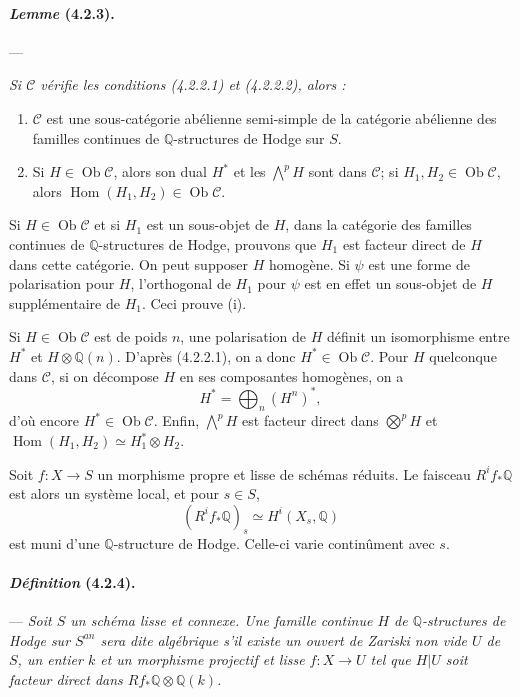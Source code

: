 \documentclass[10pt]{article}
\newcommand{\Q}{\mathbb Q}
\newcommand{\Hom}{\operatorname{Hom}}
\newcommand{\Ob}{\operatorname{Ob}}
\begin{document}
\paragraph{\emph{Lemme} (4.2.3).} --- {\itshape Si $\mathcal C$ vérifie les conditions (4.2.2.1) et (4.2.2.2), alors :
\begin{enumerate}[label=(\roman*)]
\item $\mathcal C$ est une sous-catégorie abélienne semi-simple de la catégorie abélienne des familles continues de $\Q$-structures de Hodge sur $S$.
\item Si $H\in\Ob\mathcal C$, alors son dual $H^*$ et les $\bigwedge^pH$ sont dans $\mathcal C$; si $H_1,H_2\in\Ob\mathcal C$, alors $\Hom(H_1,H_2)\in\Ob\mathcal C$.
\end{enumerate}}

Si $H\in\Ob\mathcal C$ et si $H_1$ est un sous-objet de $H$, dans la catégorie des familles continues de $\Q$-structures de Hodge, prouvons que $H_1$ est facteur direct de $H$ dans cette catégorie. On peut supposer $H$ homogène. Si $\psi$ est une forme de polarisation pour $H$, l'orthogonal de $H_1$ pour $\psi$ est en effet un sous-objet de $H$ supplémentaire de $H_1$. Ceci prouve (i).

Si $H\in\Ob\mathcal C$ est de poids $n$, une polarisation de $H$ définit un isomorphisme entre $H^*$ et $H\otimes\Q(n)$. D'après (4.2.2.1), on a donc $H^*\in\Ob\mathcal C$. Pour $H$ quelconque dans $\mathcal C$, si on décompose $H$ en ses composantes homogènes, on a
\[
H^*=\bigoplus_n (H^n)^*,
\]
d'où encore $H^*\in\Ob\mathcal C$. Enfin, $\bigwedge^pH$ est facteur direct dans $\bigotimes^pH$ et $\Hom(H_1,H_2)\simeq H_1^*\otimes H_2$.

Soit $f:X\to S$ un morphisme propre et lisse de schémas réduits. Le faisceau $R^if_*\Q$ est alors un système local, et pour $s\in S$,
\[
(R^if_*\Q)_s\simeq H^i(X_s,\Q)
\]
est muni d'une $\Q$-structure de Hodge. Celle-ci varie continûment avec $s$.

\paragraph{\emph{Définition} (4.2.4).} --- {\itshape Soit $S$ un schéma lisse et connexe. Une famille continue $H$ de $\Q$-structures de Hodge sur $S^{an}$ sera dite algébrique s'il existe un ouvert de Zariski non vide $U$ de $S$, un entier $k$ et un morphisme projectif et lisse $f:X\to U$ tel que $H|U$ soit facteur direct dans $Rf_*\Q\otimes\Q(k)$.}
\end{document}
